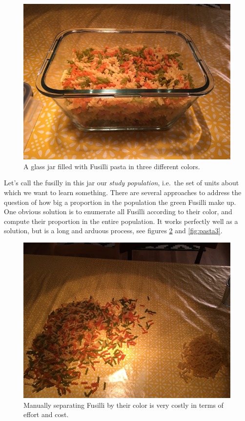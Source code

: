\documentclass[]{book}
\begin{document}
\begin{figure}

{\centering \includegraphics[width=0.9\linewidth]{images/pasta1} 

}

\caption{A glass jar filled with Fusilli pasta in three different colors.}\label{fig:pasta1}
\end{figure}

Let's call the fusilly in this jar our \emph{study population}, i.e.~the
set of units about which we want to learn something. There are several
approaches to address the question of how big a proportion in the
population the green Fusilli make up. One obvious solution is to
enumerate all Fusilli according to their color, and compute their
proportion in the entire population. It works perfectly well as a
solution, but is a long and arduous process, see figures
\ref{fig:pasta2} and \ref{fig:pasta3}.

\begin{figure}

{\centering \includegraphics[width=0.9\linewidth]{images/pasta2} 

}

\caption{Manually separating Fusilli by their color is very costly in terms of effort and cost.}\label{fig:pasta2}
\end{figure}
\end{document}
